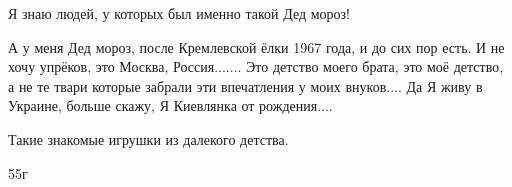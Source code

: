 \begin{itemize}
Я знаю людей, у которых был именно такой Дед мороз!


А у меня Дед мороз, после Кремлевской ёлки 1967 года, и до сих пор есть. И не хочу
упрёков, это Москва, Россия....... Это детство моего брата, это моё детство, а не те
твари которые забрали эти впечатления у моих внуков.... Да Я живу в
Украине, больше скажу, Я Киевлянка от рождения....


Такие знакомые игрушки из далекого детства.

55г



\end{itemize} %
